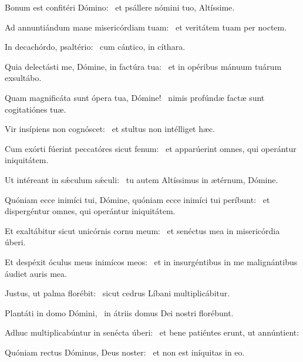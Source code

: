 \item Bonum est confitéri Dómino:~\psstar{} et psállere nómini tuo, Altíssime.

\item Ad annuntiándum mane misericórdiam tuam:~\psstar{} et veritátem tuam per noctem.

\item In decachórdo, psaltério:~\psstar{} cum cántico, in cíthara.

\item Quia delectásti me, Dómine, in factúra tua:~\psstar{} et in opéribus mánuum tuárum exsultábo.

\item Quam magnificáta sunt ópera tua, Dómine!~\psstar{} nimis profúndæ factæ sunt cogitatiónes tuæ.

\item Vir insípiens non cognóscet:~\psstar{} et stultus non intélliget hæc.

\item Cum exórti fúerint peccatóres sicut fenum:~\psstar{} et apparúerint omnes, qui operántur iniquitátem.

\item Ut intéreant in sǽculum sǽculi:~\psstar{} tu autem Altíssimus in ætérnum, Dómine.

\item Quóniam ecce inimíci tui, Dómine, quóniam ecce inimíci tui períbunt:~\psstar{} et dispergéntur omnes, qui operántur iniquitátem.

\item Et exaltábitur sicut unicórnis cornu meum:~\psstar{} et senéctus mea in misericórdia úberi.

\item Et despéxit óculus meus inimícos meos:~\psstar{} et in insurgéntibus in me malignántibus áudiet auris mea.

\item Justus, ut palma florébit:~\psstar{} sicut cedrus Líbani multiplicábitur.

\item Plantáti in domo Dómini,~\psstar{} in átriis domus Dei nostri florébunt.

\item Adhuc multiplicabúntur in senécta úberi:~\psstar{} et bene patiéntes erunt, ut annúntient:

\item Quóniam rectus Dóminus, Deus noster:~\psstar{} et non est iníquitas in eo.